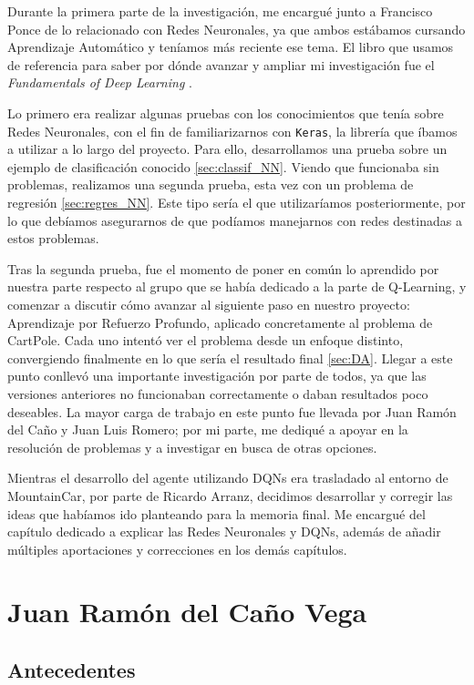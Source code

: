 Durante la primera parte de la investigación, me encargué junto a Francisco Ponce de lo relacionado con Redes Neuronales, ya que ambos estábamos cursando Aprendizaje Automático y teníamos más reciente ese tema. El libro que usamos de referencia para saber por dónde avanzar y ampliar mi investigación fue el \textit{Fundamentals of Deep Learning} \citep{Buduma:backprop}.

Lo primero era realizar algunas pruebas con los conocimientos que tenía sobre Redes Neuronales, con el fin de familiarizarnos con \texttt{Keras}, la librería que íbamos a utilizar a lo largo del proyecto. Para ello, desarrollamos una prueba sobre un ejemplo de clasificación conocido \ref{sec:classif_NN}. Viendo que funcionaba sin problemas, realizamos una segunda prueba, esta vez con un problema de regresión \ref{sec:regres_NN}. Este tipo sería el que utilizaríamos posteriormente, por lo que debíamos asegurarnos de que podíamos manejarnos con redes destinadas a estos problemas. 

Tras la segunda prueba, fue el momento de poner en común lo aprendido por nuestra parte respecto al grupo que se había dedicado a la parte de Q-Learning, y comenzar a discutir cómo avanzar al siguiente paso en nuestro proyecto: Aprendizaje por Refuerzo Profundo, aplicado concretamente al problema de CartPole. Cada uno intentó ver el problema desde un enfoque distinto, convergiendo finalmente en lo que sería el resultado final \ref{sec:DA}. Llegar a este punto conllevó una importante investigación por parte de todos, ya que las versiones anteriores no funcionaban correctamente o daban resultados poco deseables. La mayor carga de trabajo en este punto fue llevada por Juan Ramón del Caño y Juan Luis Romero; por mi parte, me dediqué a apoyar en la resolución de problemas y a investigar en busca de otras opciones.

Mientras el desarrollo del agente utilizando DQNs era trasladado al entorno de MountainCar, por parte de Ricardo Arranz, decidimos desarrollar y corregir las ideas que habíamos ido planteando para la memoria final. Me encargué del capítulo dedicado a explicar las Redes Neuronales y DQNs, además de añadir múltiples aportaciones y correcciones en los demás capítulos.


\section{Juan Ramón del Caño Vega}


\subsection{Antecedentes}

